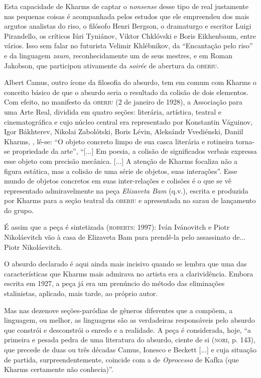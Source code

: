 Esta capacidade de Kharms de captar o \emph{nonsense} desse tipo de real
justamente nas pequenas coisas é acompanhada pelos estudos que ele
empreendeu dos mais argutos analistas do riso, o filósofo Henri Bergson,
o dramaturgo e escritor Luigi Pirandello, os críticos Iúri Tyniánov,
Viktor Chklóvski e Boris Eikhenbaum, entre vários. Isso sem falar no
futurista Velimir Khlébnikov, da ``Encantação pelo riso'' e da linguagem
\emph{zaum}, reconhecidamente um de seus mestres, e em Roman Jakobson,
que participou ativamente da \emph{soirée} de abertura da
\textsc{oberiu}.

Albert Camus, outro ícone da filosofia do absurdo, tem em comum com
Kharms o conceito básico de que o absurdo seria o resultado da colisão
de dois elementos. Com efeito, no manifesto da \textsc{oberiu} (2 de
janeiro de 1928), a Associação para uma Arte Real, dividida em quatro
seções: literária, artística, teatral e cinematográfica e cujo núcleo
central era representado por Konstantin Váguinov, Igor Bákhterev,
Nikolai Zabolótski, Boris Lévin, Aleksándr Vvediénski, Daniil Kharms, ,
lê-se: ``O objeto concreto limpo de sua casca literária e rotineira
torna-se propriedade da arte'', ``{[}...{]} Em poesia, a colisão de
significados verbais expressa esse objeto com precisão mecânica.
{[}...{]} A atenção de Kharms focaliza não a figura estática, mas a
colisão de uma série de objetos, suas interações''. Esse mundo de
objetos concretos em suas inter-relações e colisões é o que se vê
representado admiravelmente na peça \emph{Elizaveta Bam} (q.v.), escrita
e produzida por Kharms para a seção teatral da \textsc{oberiu} e
apresentada no sarau de lançamento do grupo.

É assim que a peça é sintetizada (\textsc{roberts}: 1997): Iván
Ivánovitch e Piotr Nikoláevitch vão à casa de Elizaveta Bam para
prendê-la pelo assassinato de... Piotr Nikoláevitch.

O absurdo declarado é aqui ainda mais incisivo quando se lembra que uma
das características que Kharms mais admirava no artista era a
clarividência. Embora escrita em 1927, a peça já era um prenúncio do
método das eliminações stalinistas, aplicado, mais tarde, ao próprio
autor.

Mas nas dezenove seções-paródias de gêneros diferentes que a compõem, a
linguagem, ou melhor, as linguagens são as verdadeiras responsáveis pelo
absurdo que constrói e desconstrói o enredo e a realidade. A peça é
considerada, hoje, ``a primeira e pesada pedra de uma literatura do
absurdo, ciente de si (\textsc{nori}, p. 143), que precede de duas ou
três décadas Camus, Ionesco e Beckett {[}...{]} e cuja situação de
partida, surpreendentemente, coincide com a de \emph{Oprocesso} de Kafka
(que Kharms certamente não conhecia)''.

